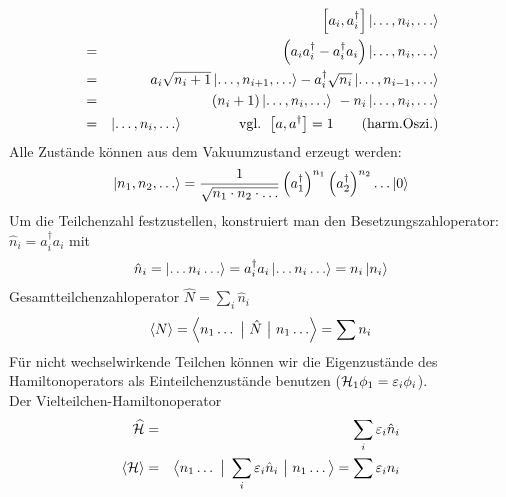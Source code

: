 \begin{eqnarray*}
&{}&\left[a_i,a_i^\dagger\ri] \left| \dots,n_i,\dots\ro\\
\g \left (a_ia_i^\dagger - a_i^\dagger a_i\ri) \left |\dots,n_i,\dots\ro\\
\g a_i \sqrt{n_i+1} \left |\dots,n_{i+1},\dots\ro-a_i^\dagger \sqrt{n_i}\left |\dots,n_{i-1},\dots\ro\\
\g (n_{i}+1) \left |\dots,n_i,\dots\ro\ -n_i\left |\dots,n_i,\dots\ro\\
\g \left |\dots,n_i,\dots\ro\qquad\qquad \text{vgl.  }\left[a,a^\dagger \ri]=1\qquad \text{(harm.Oszi.)}
\end{eqnarray*}
Alle Zustände können aus dem Vakuumzustand erzeugt werden:
\begin{eqnarray*}
\left | n_1,n_2,\dots\ro = \frac 1 {\sqrt{n_1\cdot n_2\cdot\dots}}\left(a_1^\dagger\ri)^{n_1}\left(a_2^\dagger\ri)^{n_2}\dots \left | 0 \ro
\end{eqnarray*}
Um die Teilchenzahl festzustellen, konstruiert man den Besetzungszahloperator: $\hat n_i = a_i^\dagger a_i$ mit 
\begin{eqnarray*}
\hat n_i = \left | \dots n_i \dots \ro = a_i^\dagger  a_i \left | \dots n_i \dots \ro = n_i \left | n_i \ro
\end{eqnarray*}
Gesamtteilchenzahloperator $\hat N = \sum \limits_i \hat n_i$
\begin{eqnarray*} \lo N \ro = \lo n_1 \dots \s \hat N \s n_1 \dots \ro = \sum n_i \end{eqnarray*}
Für nicht wechselwirkende Teilchen können wir die Eigenzustände des Hamiltonoperators als Einteilchenzustände benutzen ($\mathcal H_1 \phi_1 = \varepsilon_i \phi_i$).\\
Der Vielteilchen-Hamiltonoperator
\begin{eqnarray*} \widehat {\mathcal H} &=& \sum \limits_i \varepsilon _i \hat n_i\\
\left < \mathcal H \right > &=& \big< n_1 \dots \ \big| \  \sum \limits_i \varepsilon_i\hat n_i \ \big| \  n_1 \dots\big> = \sum \varepsilon_i n_i
\end{eqnarray*}


